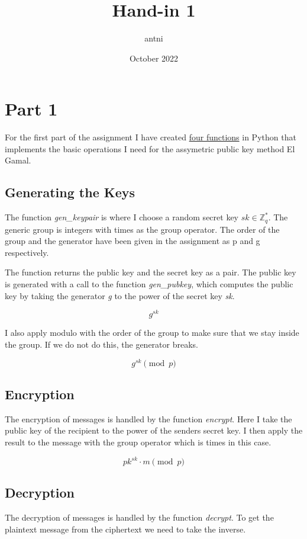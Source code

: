 \documentclass{article}
\title{Hand-in 1}
\author{antni}
\date{October 2022}
\begin{document}
\maketitle

\section{Part 1}

For the first part of the assignment I have created \hyperref[subsec:result1]{four functions} in Python that implements the basic operations I need for the assymetric public key method El Gamal.


\subsection{Generating the Keys}
The function \textit{gen\_keypair} is where I choose a random secret key \(sk \in \mathbb{Z}^*_q\). The generic group is integers with times as the group operator. The order of the group and the generator have been given in the assignment as p and g respectively.

The function returns the public key and the secret key as a pair. The public key is generated with a call to the function \textit{gen\_pubkey}, which computes the public key by taking the generator \textit{g} to the power of the secret key \textit{sk}.

\[g^{sk}\]

I also apply modulo with the order of the group to make sure that we stay inside the group. If we do not do this, the generator breaks.

\[g^{sk} \pmod p\]


\subsection{Encryption}
The encryption of messages is handled by the function \textit{encrypt}.
Here I take the public key of the recipient to the power of the senders secret key.
I then apply the result to the message with the group operator which is times in this case.

\[pk^{sk} \cdot m \pmod p\]

\newpage

\subsection{Decryption}
The decryption of messages is handled by the function \textit{decrypt}.
To get the plaintext message from the ciphertext we need to take the inverse.
\end{document}
